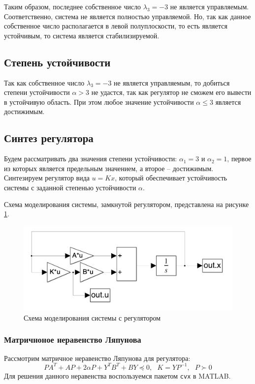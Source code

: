 Таким образом, последнее собственное число $\lambda_3 = -3$ не является управляемым. Соответственно, система не является полностью управляемой. 
Но, так как данное собственное число располагается в левой полуплоскости, то есть является устойчивым, то система является стабилизируемой. 

\subsection{Степень устойчивости}
Так как собственное число $\lambda_3 = -3$ не является управляемым, то добиться степени устойчивости $\alpha > 3$ не удастся, 
так как регулятор не сможем его вывести в устойчивую область. При этом любое значение устойчивости $\alpha \le 3$ является достижимым.

\subsection{Синтез регулятора}
Будем рассматривать два значения степени устойчивости: $\alpha_1 = 3$ и $\alpha_2 = 1$, 
первое из которых является предельным значением, а второе -- достижимым. 
Синтезируем регулятор вида $u = Kx$, который обеспечивает устойчивость системы с заданной степенью устойчивости $\alpha$.

Схема моделирования системы, замкнутой регулятором, представлена на рисунке \ref{fig:scheme1}.
\begin{figure}[ht!]
    \centering
    \includegraphics[width=\textwidth]{media/scheme1.png}
    \caption{Схема моделирования системы с регулятором}
    \label{fig:scheme1}
\end{figure}

\subsubsection{Матричноное неравенство Ляпунова}
Рассмотрим матричное неравенство Ляпунова для регулятора:
\begin{equation}
    PA^T + AP + 2\alpha P + Y^T B^T + BY \preceq 0, ~~~ K = Y P^{-1}, ~~~ P \succ 0
\end{equation}
Для решения данного неравенства воспользуемся пакетом \texttt{cvx} в MATLAB. 

